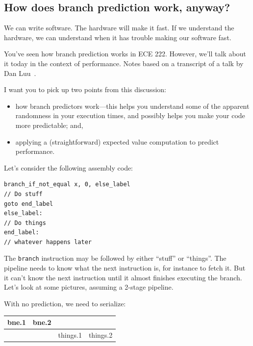 \documentclass[a4paper]{report}
\begin{document}
\subsection*{How does branch prediction work, anyway?}
We can write software. The hardware will make it fast. If we understand the hardware, we can understand when it has trouble making our software fast.

You've seen how branch prediction works in ECE 222. However, we'll talk about it today in the context of performance. Notes based on a transcript of a talk by Dan Luu~\cite{branchprediction}.

I want you to pick up two points from this discussion:
\vspace*{-1em}
\begin{itemize}[noitemsep]
\item how branch predictors work---this helps you understand some of the apparent randomness in your
execution times, and possibly helps you make your code more predictable; and,
\item applying a (straightforward) expected value computation to predict performance.
\end{itemize}

Let's consider the following assembly code:

\hspace*{2em} \begin{minipage}{.4\textwidth} \begin{lstlisting}
branch_if_not_equal x, 0, else_label
// Do stuff
goto end_label
else_label:
// Do things
end_label:
// whatever happens later
\end{lstlisting}
\end{minipage}

The {\tt branch} instruction may be followed by either ``stuff'' or ``things''.
The pipeline needs to know what the next instruction is, for instance to fetch it.
But it can't know the next instruction until it almost finishes executing the branch.
Let's look at some pictures, assuming a 2-stage pipeline.

With no prediction, we need to serialize:

\begin{center}
\begin{tabular}{c|c|c|c}
bne.1 & bne.2 \\ \hline
& & things.1 & things.2
\end{tabular}
\end{center}
\end{document}
